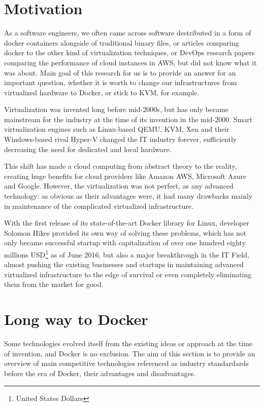 
\section{Motivation}

As a software engineers,
we often came across software destributed
in a form of docker containers alongside
of traditional binary files,
or articles comparing docker to the other kind of virtualization techniques,
or DevOps research papers comparing the performance of cloud instances in AWS,
but did not know what it was about.
Main goal of this research for us is to provide an answer
for an important question, whether it is worth
to change our infrastructures
from virtualized hardware to Docker, or stick to KVM, for example.

Virtualization was invented long before mid-2000s,
but has only became mainstream for the industry at the
time of its invention in the mid-2000.
Smart virtualization engines such as Linux-based QEMU, KVM, Xen
and their Windows-based rival Hyper-V changed the IT industry forever,
sufficiently decreasing the need for dedicated and local hardware.

This shift has made a cloud computing from abstract theory to the reality,
creating huge benefits for cloud providers like Amazon AWS,
Microsoft Azure and Google.
However, the virtualization was not perfect, as any advanced technology:
as obvious as their advantages were, it had many drawbacks mainly in maintenance
of the complicated virtualized infrastructure.

With the first release of its state-of-the-art Docker library for Linux,
developer Solomon Hikes provided its own way of solving these problems,
which has not only became successful startup
with capitalization of over one hundred eighty millions
USD\footnote{United States Dollars} as of June 2016\cite{DockerCapitalization},
but also a major breakthrough in the IT Field, almost pushing the existing
businesses and startups in maintaining advanced virtualized infrastructure
to the edge of survival or even completely eliminating
them from the market for good\cite{DockerImpact}.

\section{Long way to Docker}

Some technologies evolved itself from the existing ideas
or approach at the time of invention, and Docker is no exclusion.
The aim of this section is to provide an overview of main competitive
technologies referenced as industry standardards
before the era of Docker, their advantages and disadvantages.

